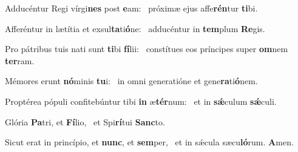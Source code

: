 \item Adducéntur Regi vírgi\textbf{nes} post \textbf{e}am:~\psstar{} próximæ ejus affe\textbf{rén}tur \textbf{ti}bi.
\item Afferéntur in lætítia et exsul\textbf{ta}ti\textbf{ó}ne:~\psstar{} adducéntur in \textbf{tem}plum \textbf{Re}gis.
\item Pro pátribus tuis nati sunt \textbf{ti}bi \textbf{fí}lii:~\psstar{} constítues eos príncipes super \textbf{om}nem \textbf{ter}ram.
\item Mémores erunt \textbf{nó}minis \textbf{tu}i:~\psstar{} in omni generatióne et gene\textbf{ra}ti\textbf{ó}nem.
\item Proptérea pópuli confitebúntur tibi \textbf{in} æ\textbf{tér}num:~\psstar{} et in \textbf{sǽ}culum \textbf{sǽ}culi.
\item Glória \textbf{Pa}tri, et \textbf{Fí}lio,~\psstar{} et Spi\textbf{rí}tui \textbf{Sanc}to.
\item Sicut erat in princípio, et \textbf{nunc}, et \textbf{sem}per,~\psstar{} et in sǽcula sæcu\textbf{ló}rum. \textbf{A}men.

